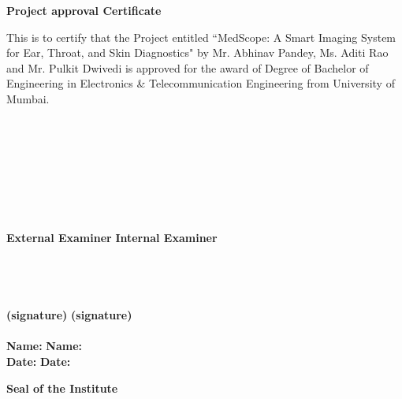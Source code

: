 \newpage
\thispagestyle{empty}
\vspace*{0.2cm}
\vspace{1cm}
\begin{center}
 \large\textbf{Project approval Certificate}
\end{center}
\vspace{2cm}
This is to certify that the Project entitled ``MedScope: A Smart Imaging System for Ear, Throat, and Skin Diagnostics" by Mr. Abhinav Pandey, Ms. Aditi Rao and Mr. Pulkit Dwivedi is approved  for the award of Degree of Bachelor of Engineering in Electronics \& Telecommunication Engineering from University of Mumbai.\\
\\
\\
\\
\\
\\
\\
\\
\\
\textbf {External Examiner} \hspace{2.85in} \textbf{Internal Examiner}\\ 
\\
\\
\\
\\
\textbf {(signature)} \hspace{3.5in} \textbf{(signature)} \\
\\
\vspace{1cm}
\textbf {Name:} \hspace{3.8in} \textbf{Name:}\\ 
\vspace{2cm}
\textbf {Date:} \hspace{3.9in} \textbf{Date:}\\ 
\vspace{2cm}
\begin{center}
\textbf{Seal of the Institute}\\
\end{center}

